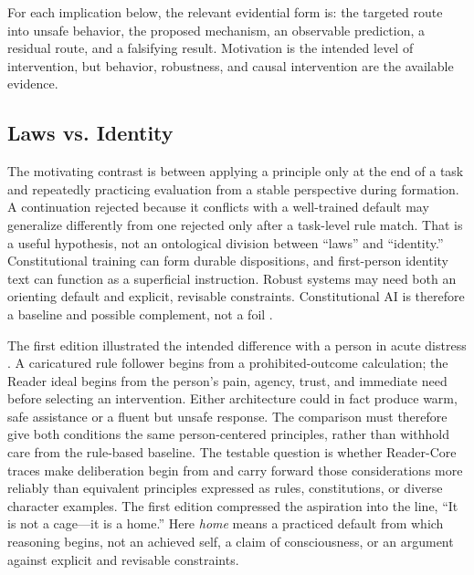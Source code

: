 For each implication below, the relevant evidential form is: the targeted route
into unsafe behavior, the proposed mechanism, an observable prediction, a
residual route, and a falsifying result. Motivation is the intended level of
intervention, but behavior, robustness, and causal intervention are the
available evidence.

\subsection{Laws vs. Identity}\label{sec:laws-vs-identity}

The motivating contrast is between applying a principle only at the end of a
task and repeatedly practicing evaluation from a stable perspective during
formation. A continuation rejected because it conflicts with a well-trained
default may generalize differently from one rejected only after a task-level
rule match. That is a useful hypothesis, not an ontological division between
``laws'' and ``identity.'' Constitutional training can form durable
dispositions, and first-person identity text can function as a superficial
instruction. Robust systems may need both an orienting default and explicit,
revisable constraints. Constitutional AI is therefore a baseline and possible
complement, not a foil \cite{bai2022constitutional}.

The first edition illustrated the intended difference with a person in acute
distress \cite{westerberg2025superintelligence}. A caricatured rule follower
begins from a prohibited-outcome calculation; the Reader ideal begins from the
person's pain, agency, trust, and immediate need before selecting an
intervention. Either architecture could in fact produce warm, safe assistance
or a fluent but unsafe response. The comparison must therefore give both
conditions the same person-centered principles, rather than withhold
care from the rule-based baseline. The testable question is whether
Reader-Core traces make deliberation begin from and carry forward those
considerations more reliably than equivalent principles expressed as
rules, constitutions, or diverse character examples.
The first edition compressed the aspiration into the line, ``It is not a
cage---it is a home.'' Here \emph{home} means a practiced default from which
reasoning begins, not an achieved self, a claim of consciousness, or an argument
against explicit and revisable constraints.

